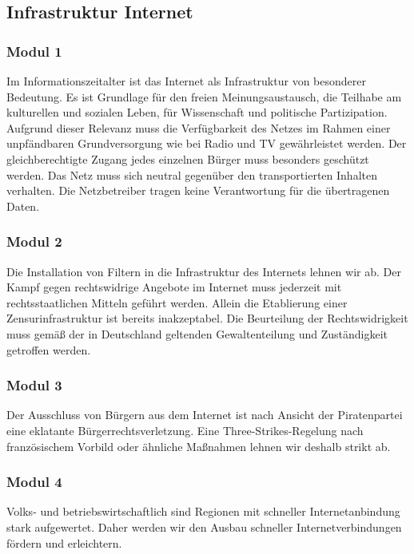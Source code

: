 \subsection*{Infrastruktur Internet}
\label{wp:monopol:inet1}

\subsubsection{Modul 1}
\abstimmung
Im Informationszeitalter ist das Internet als Infrastruktur von besonderer Bedeutung. Es ist Grundlage für den freien Meinungsaustausch, die Teilhabe am kulturellen und sozialen Leben, für Wissenschaft und politische Partizipation. Aufgrund dieser Relevanz muss die Verfügbarkeit des Netzes im Rahmen einer unpfändbaren Grundversorgung wie bei Radio und TV gewährleistet werden. Der gleichberechtigte Zugang jedes einzelnen Bürger muss besonders geschützt werden. Das Netz muss sich neutral gegenüber den transportierten Inhalten verhalten. Die Netzbetreiber tragen keine Verantwortung für die übertragenen Daten.

\subsubsection{Modul 2}
\abstimmung
Die Installation von Filtern in die Infrastruktur des Internets lehnen wir ab. Der Kampf gegen rechtswidrige Angebote im Internet muss jederzeit mit rechtsstaatlichen Mitteln geführt werden. Allein die Etablierung einer Zensurinfrastruktur ist bereits inakzeptabel. Die Beurteilung der Rechtswidrigkeit muss gemäß der in Deutschland geltenden Gewaltenteilung und Zuständigkeit getroffen werden.

\subsubsection{Modul 3}
\abstimmung
Der Ausschluss von Bürgern aus dem Internet ist nach Ansicht der Piratenpartei eine eklatante Bürgerrechtsverletzung. Eine Three-Strikes-Regelung nach französischem Vorbild oder ähnliche Maßnahmen lehnen wir deshalb strikt ab.

\subsubsection{Modul 4}
\abstimmung
Volks- und betriebswirtschaftlich sind Regionen mit schneller Internetanbindung stark aufgewertet. Daher werden wir den Ausbau schneller Internetverbindungen fördern und erleichtern.

